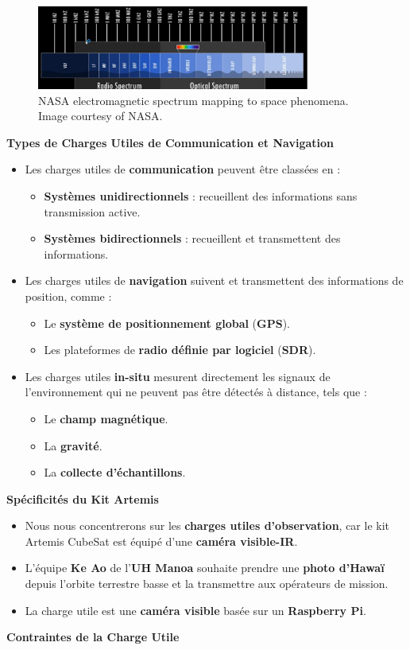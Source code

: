 \begin{figure}[H] %
    \centering
    \includegraphics[width=0.8\textwidth]{figures/3.15.jpg}
    \caption{NASA electromagnetic spectrum mapping to space phenomena. Image courtesy of NASA.}
    \label{fig:communication2}
\end{figure}
\textbf{Types de Charges Utiles de Communication et Navigation}
\begin{itemize}
    \item Les charges utiles de \textbf{communication} peuvent être classées en :
    \begin{itemize}
        \item \textbf{Systèmes unidirectionnels} : recueillent des informations sans transmission active.  
        \item \textbf{Systèmes bidirectionnels} : recueillent et transmettent des informations.  
    \end{itemize}
    \item Les charges utiles de \textbf{navigation} suivent et transmettent des informations de position, comme :
    \begin{itemize}
        \item Le \textbf{système de positionnement global} (\textbf{GPS}).  
        \item Les plateformes de \textbf{radio définie par logiciel} (\textbf{SDR}).  
    \end{itemize}
    \item Les charges utiles \textbf{in-situ} mesurent directement les signaux de l’environnement qui ne peuvent pas être détectés à distance, tels que :
    \begin{itemize}
        \item Le \textbf{champ magnétique}.  
        \item La \textbf{gravité}.  
        \item La \textbf{collecte d’échantillons}.  
    \end{itemize}
\end{itemize}
\textbf{Spécificités du Kit Artemis}

\begin{itemize}
    \item Nous nous concentrerons sur les \textbf{charges utiles d'observation}, car le kit Artemis CubeSat est équipé d'une \textbf{caméra visible-IR}.  
    \item L'équipe \textbf{Ke Ao} de l'\textbf{UH Manoa} souhaite prendre une \textbf{photo d’Hawaï} depuis l'orbite terrestre basse et la transmettre aux opérateurs de mission.  
    \item La charge utile est une \textbf{caméra visible} basée sur un \textbf{Raspberry Pi}.  
\end{itemize}
\textbf{Contraintes de la Charge Utile}


